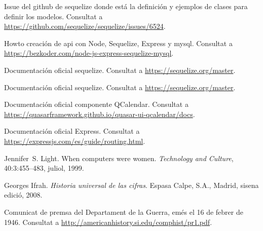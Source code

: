\documentclass[11pt,spanish,listoffigures,listoftables]{tfgetsinf}
\begin{document}
\begin{thebibliography}{10}

   Issue del github de sequelize donde está la definición y ejemplos de clases para definir los modelos.
   \newblock Consultat a 
   \url{https://github.com/sequelize/sequelize/issues/6524}.

   Howto creación de api con Node, Sequelize, Express y mysql.
   \newblock Consultat a 
   \url{https://bezkoder.com/node-js-express-sequelize-mysql}.

   Documentación oficial sequelize.
   \newblock Consultat a 
   \url{https://sequelize.org/master}.

   Documentación oficial sequelize.
   \newblock Consultat a 
   \url{https://sequelize.org/master}.

   Documentación oficial componente QCalendar.
   \newblock Consultat a 
   \url{https://quasarframework.github.io/quasar-ui-qcalendar/docs}.

   Documentación oficial Express.
   \newblock Consultat a 
   \url{https://expressjs.com/es/guide/routing.html}.

   Jennifer~S. Light.
   \newblock When computers were women.
   \newblock \textit{Technology and Culture}, 40:3:455--483, juliol, 1999.

   Georges Ifrah.
   \newblock \textit{Historia universal de las cifras}.
   \newblock Espasa Calpe, S.A., Madrid, sisena edició, 2008.

   Comunicat de premsa del Departament de la Guerra, 
   emés el 16 de febrer de 1946. 
   \newblock Consultat a 
   \url{http://americanhistory.si.edu/comphist/pr1.pdf}.

\end{thebibliography}
\cleardoublepage
\end{document}
